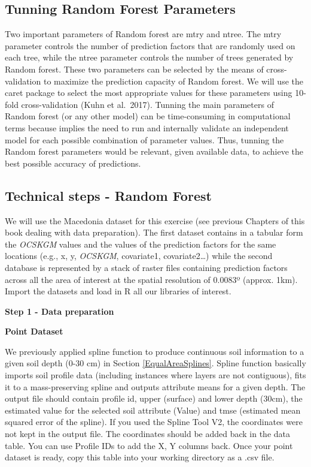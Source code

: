 \documentclass[10pt,b5paper,]{book}
\theoremstyle{definition}
\theoremstyle{definition}
\theoremstyle{definition}
\theoremstyle{remark}
\begin{document}
\hypertarget{tunning-random-forest-parameters}{%
\subsection{Tunning Random Forest
Parameters}\label{tunning-random-forest-parameters}}

Two important parameters of Random forest are mtry and ntree. The mtry
parameter controls the number of prediction factors that are randomly
used on each tree, while the ntree parameter controls the number of
trees generated by Random forest. These two parameters can be selected
by the means of cross-validation to maximize the prediction capacity of
Random forest. We will use the caret package to select the most
appropriate values for these parameters using 10-fold cross-validation
(Kuhn et al.~2017). Tunning the main parameters of Random forest (or any
other model) can be time-consuming in computational terms because
implies the need to run and internally validate an independent model for
each possible combination of parameter values. Thus, tunning the Random
forest parameters would be relevant, given available data, to achieve
the best possible accuracy of predictions.

\hypertarget{technical-steps---random-forest}{%
\subsection{Technical steps - Random
Forest}\label{technical-steps---random-forest}}

We will use the Macedonia dataset for this exercise (see previous
Chapters of this book dealing with data preparation). The first dataset
contains in a tabular form the \emph{OCSKGM} values and the values of
the prediction factors for the same locations (e.g., x, y,
\emph{OCSKGM}, covariate1, covariate2\ldots{}) while the second database
is represented by a stack of raster files containing prediction factors
across all the area of interest at the spatial resolution of 0.0083º
(approx. 1km). Import the datasets and load in R all our libraries of
interest.

\textbf{Step 1 - Data preparation}

\textbf{Point Dataset}

We previously applied spline function to produce continuous soil
information to a given soil depth (0-30 cm) in Section
\ref{EqualAreaSplines}. Spline function basically imports soil profile
data (including instances where layers are not contiguous), fits it to a
mass-preserving spline and outputs attribute means for a given depth.
The output file should contain profile id, upper (surface) and lower
depth (30cm), the estimated value for the selected soil attribute
(Value) and tmse (estimated mean squared error of the spline). If you
used the Spline Tool V2, the coordinates were not kept in the output
file. The coordinates should be added back in the data table. You can
use Profile IDs to add the X, Y columns back. Once your point dataset is
ready, copy this table into your working directory as a .csv file.
\end{document}
